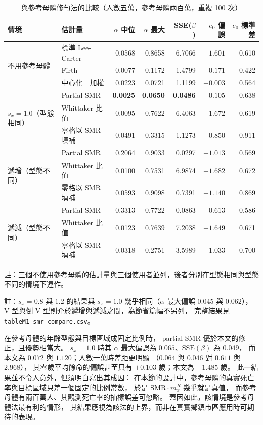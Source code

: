 \documentclass[UTF8, fontset=macnew, a4paper, 12pt]{ctexart}
\begin{document}
\begin{table}[H]
\centering
\caption{與參考母體修勻法的比較（人數五萬，參考母體兩百萬，重複 100 次）}
\small
\renewcommand{\arraystretch}{1.1}
\begin{tabular}{llrrrrr}
\toprule
情境 & 估計量 & $\alpha$ 中位 & $\alpha$ 最大 & SSE($\beta$) & $e_0$ 偏誤 & $e_0$ 標準差\\
\midrule
\multirow{3}{*}{不用參考母體}
 & 標準 Lee-Carter        & 0.0568 & 0.8658 & 6.7066 & $-1.601$ & 0.610\\
 & Firth          & 0.0077 & 0.1172 & 1.4799 & $-0.171$ & 0.422\\
 & 中心化＋加權   & 0.0223 & 0.0721 & 1.1199 & $+0.003$ & 0.564\\
\midrule
\multirow{3}{*}{$s_x=1.0$（型態相同）}
 & Partial SMR    & \textbf{0.0025} & \textbf{0.0650} & \textbf{0.0486} & $-0.105$ & 0.638\\
 & Whittaker 比值 & 0.0095 & 0.7622 & 6.4063 & $-1.672$ & 0.619\\
 & 零格以 SMR 填補 & 0.0491 & 0.3315 & 1.1273 & $-0.850$ & 0.911\\
\midrule
\multirow{3}{*}{遞增（型態不同）}
 & Partial SMR    & 0.2064 & 0.9033 & 0.0297 & $-1.013$ & 0.569\\
 & Whittaker 比值 & 0.0100 & 0.7531 & 6.9874 & $-1.682$ & 0.672\\
 & 零格以 SMR 填補 & 0.0593 & 0.9098 & 0.7391 & $-1.140$ & 0.869\\
\midrule
\multirow{3}{*}{遞減（型態不同）}
 & Partial SMR    & 0.3313 & 0.7722 & 0.0863 & $+0.613$ & 0.586\\
 & Whittaker 比值 & 0.0123 & 0.7639 & 7.2038 & $-1.649$ & 0.671\\
 & 零格以 SMR 填補 & 0.0318 & 0.2751 & 3.5989 & $-1.033$ & 0.700\\
\bottomrule
\end{tabular}

{\footnotesize 註：三個不使用參考母體的估計量與三個使用者並列，後者分別在型態相同與型態不同的情境下運作。}


\vspace{2pt}
\parbox{0.92\textwidth}{\footnotesize 註：$s_x=0.8$ 與 $1.2$ 的結果與
$s_x=1.0$ 幾乎相同（$\alpha$ 最大偏誤 $0.045$ 與 $0.062$），
V 型與倒 V 型則介於遞增與遞減之間，為節省篇幅不另列，
完整結果見 \texttt{tableM1\_smr\_compare.csv}。}
\label{tab:smr}
\end{table}

在參考母體的年齡型態與目標區域成固定比例時，
partial SMR 優於本文的修正，且優勢相當大。
$s_x=1.0$ 時其 $\alpha$ 最大偏誤為 $0.065$、$\mathrm{SSE}(\beta)$ 為 $0.049$，
而本文為 $0.072$ 與 $1.120$；人數一萬時差距更明顯
（$0.064$ 與 $0.046$ 對 $0.611$ 與 $2.968$），
其零歲平均餘命的偏誤甚至只有 $+0.103$ 歲；本文為 $-1.485$ 歲。
此一結果並不令人意外，但須明白寫出其成因：
在本節的設計中，參考母體的真實死亡率與目標區域只差一個固定的比例常數，
於是 $\mathrm{SMR}\cdot m^{R}_x$ 幾乎就是真值，
而參考母體有兩百萬人、其觀測死亡率的抽樣誤差可忽略。
蓋因如此，該情境是參考母體法最有利的情形，
其結果應視為該法的上界，而非在真實鄉鎮市區應用時可期待的表現。
\end{document}
